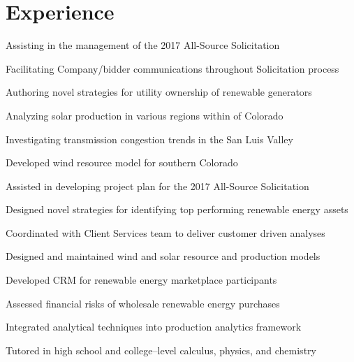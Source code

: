 \documentclass[]{deedy-resume-openfont}
\begin{document}
\begin{minipage}[t]{0.66\textwidth} 


\section{Experience}
\vspace{\topsep} %
\begin{tightemize}
\item Assisting in the management of the 2017 All-Source Solicitation
\item Facilitating Company/bidder communications throughout Solicitation process
\item Authoring novel strategies for utility ownership of renewable generators
\item Analyzing solar production in various regions within of Colorado
\item Investigating transmission congestion trends in the San Luis Valley
\item Developed wind resource model for southern Colorado
\item Assisted in developing project plan for the 2017 All-Source Solicitation
\end{tightemize}
\sectionsep

\begin{tightemize}
\item Designed novel strategies for identifying top performing renewable energy assets
\item Coordinated with Client Services team to deliver customer driven analyses
\item Designed and maintained wind and solar resource and production models
\item Developed CRM for renewable energy marketplace participants
\item Assessed financial risks of wholesale renewable energy purchases
\item Integrated analytical techniques into production analytics framework
\end{tightemize}
\sectionsep

 
\begin{tightemize}
\item Tutored in high school and college--level calculus, physics, and chemistry
\end{tightemize}
\sectionsep


\end{minipage}
\end{document}
